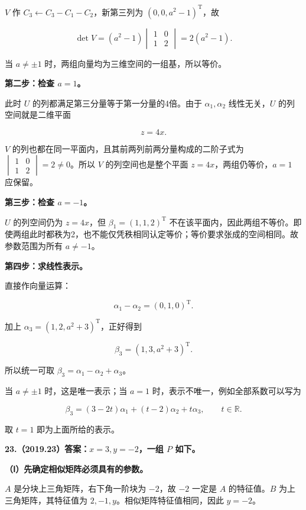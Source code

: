 \documentclass[UTF8,11pt,fontset=windows]{ctexart}
\begin{document}
$V$ 作 $C_3\leftarrow C_3-C_1-C_2$，新第三列为 $(0,0,a^2-1)^{\mathrm T}$，故

$$
\det V=(a^2-1)\begin{vmatrix}1&0\\1&2\end{vmatrix}=2(a^2-1).
$$

当 $a\ne\pm1$ 时，两组向量均为三维空间的一组基，所以等价。

\textbf{第二步：检查 $a=1$。}

此时 $U$ 的列都满足第三分量等于第一分量的4倍。由于 $\alpha_1,\alpha_2$ 线性无关，$U$ 的列空间就是二维平面

$$
z=4x.
$$

$V$ 的列也都在同一平面内，且其前两列前两分量构成的二阶子式为 $\begin{vmatrix}1&0\\1&2\end{vmatrix}=2\ne0$。所以 $V$ 的列空间也是整个平面 $z=4x$，两组仍等价，$a=1$ 应保留。

\textbf{第三步：检查 $a=-1$。}

$U$ 的列空间仍为 $z=4x$，但 $\beta_1=(1,1,2)^{\mathrm T}$ 不在该平面内，因此两组不等价。即使两组此时都秩为2，也不能仅凭秩相同认定等价；等价要求张成的空间相同。故参数范围为所有 $a\ne-1$。

\textbf{第四步：求线性表示。}

直接作向量运算：

$$
\alpha_1-\alpha_2=(0,1,0)^{\mathrm T}.
$$

加上 $\alpha_3=(1,2,a^2+3)^{\mathrm T}$，正好得到

$$
\beta_3=(1,3,a^2+3)^{\mathrm T}.
$$

所以统一可取 $\beta_3=\alpha_1-\alpha_2+\alpha_3$。

当 $a\ne\pm1$ 时，这是唯一表示；当 $a=1$ 时，表示不唯一，例如全部系数可以写为

$$
\beta_3=(3-2t)\alpha_1+(t-2)\alpha_2+t\alpha_3,
\qquad t\in\mathbb R.
$$

取 $t=1$ 即为上面所给的表示。

\clearpage

\textbf{23.（2019.23）答案：$x=3,y=-2$，一组 $P$ 如下。}

\textbf{（Ⅰ）先确定相似矩阵必须具有的参数。}

$A$ 是分块上三角矩阵，右下角一阶块为 $-2$，故 $-2$ 一定是 $A$ 的特征值。$B$ 为上三角矩阵，其特征值为 $2,-1,y$。相似矩阵特征值相同，因此 $y=-2$。
\end{document}
